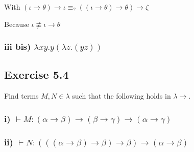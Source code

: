\documentclass[11pt]{article}
\begin{document}
With $(\iota \rightarrow \theta) \rightarrow \iota \equiv _? ((\iota \rightarrow \theta) \rightarrow \theta) \rightarrow \zeta$

Because $\iota \not \equiv \iota \rightarrow \theta$


\subsubsection*{iii bis) $\lambda xy. y(\lambda z.(yz))$}
\begin{center}




\DP
\end{center}

\subsection*{Exercise 5.4}
Find terms $M,N \in \lambda$ such that the following holds in $\lambda \rightarrow$.
\subsubsection*{i) $\vdash M : (\alpha \rightarrow \beta) \rightarrow (\beta \rightarrow \gamma) \rightarrow (\alpha \rightarrow \gamma)$}

\begin{center}


\DP
\end{center}
 
\subsubsection*{ii) $\vdash N : (((\alpha \rightarrow \beta) \rightarrow \beta) \rightarrow \beta) \rightarrow (\alpha \rightarrow \beta)$}

\begin{center}

\DP
\end{center}
\end{document}
